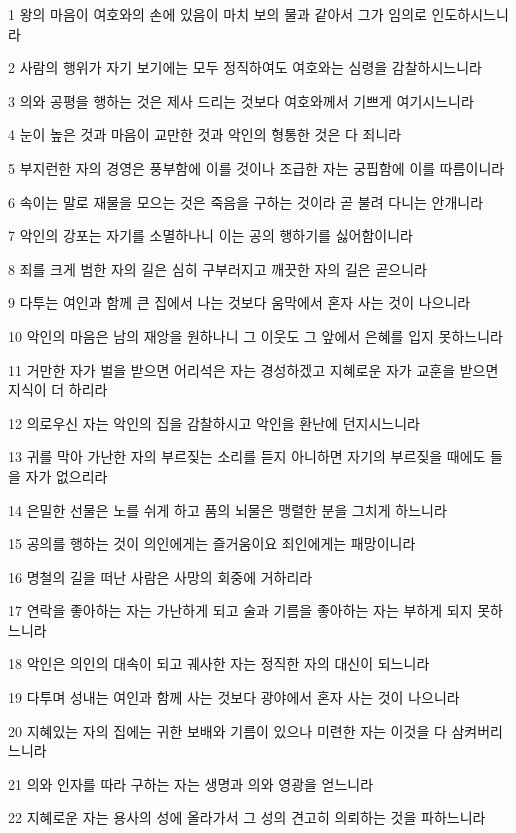 \par 1 왕의 마음이 여호와의 손에 있음이 마치 보의 물과 같아서 그가 임의로 인도하시느니라
\par 2 사람의 행위가 자기 보기에는 모두 정직하여도 여호와는 심령을 감찰하시느니라
\par 3 의와 공평을 행하는 것은 제사 드리는 것보다 여호와께서 기쁘게 여기시느니라
\par 4 눈이 높은 것과 마음이 교만한 것과 악인의 형통한 것은 다 죄니라
\par 5 부지런한 자의 경영은 풍부함에 이를 것이나 조급한 자는 궁핍함에 이를 따름이니라
\par 6 속이는 말로 재물을 모으는 것은 죽음을 구하는 것이라 곧 불려 다니는 안개니라
\par 7 악인의 강포는 자기를 소멸하나니 이는 공의 행하기를 싫어함이니라
\par 8 죄를 크게 범한 자의 길은 심히 구부러지고 깨끗한 자의 길은 곧으니라
\par 9 다투는 여인과 함께 큰 집에서 나는 것보다 움막에서 혼자 사는 것이 나으니라
\par 10 악인의 마음은 남의 재앙을 원하나니 그 이웃도 그 앞에서 은혜를 입지 못하느니라
\par 11 거만한 자가 벌을 받으면 어리석은 자는 경성하겠고 지혜로운 자가 교훈을 받으면 지식이 더 하리라
\par 12 의로우신 자는 악인의 집을 감찰하시고 악인을 환난에 던지시느니라
\par 13 귀를 막아 가난한 자의 부르짖는 소리를 듣지 아니하면 자기의 부르짖을 때에도 들을 자가 없으리라
\par 14 은밀한 선물은 노를 쉬게 하고 품의 뇌물은 맹렬한 분을 그치게 하느니라
\par 15 공의를 행하는 것이 의인에게는 즐거움이요 죄인에게는 패망이니라
\par 16 명철의 길을 떠난 사람은 사망의 회중에 거하리라
\par 17 연락을 좋아하는 자는 가난하게 되고 술과 기름을 좋아하는 자는 부하게 되지 못하느니라
\par 18 악인은 의인의 대속이 되고 궤사한 자는 정직한 자의 대신이 되느니라
\par 19 다투며 성내는 여인과 함께 사는 것보다 광야에서 혼자 사는 것이 나으니라
\par 20 지혜있는 자의 집에는 귀한 보배와 기름이 있으나 미련한 자는 이것을 다 삼켜버리느니라
\par 21 의와 인자를 따라 구하는 자는 생명과 의와 영광을 얻느니라
\par 22 지혜로운 자는 용사의 성에 올라가서 그 성의 견고히 의뢰하는 것을 파하느니라
